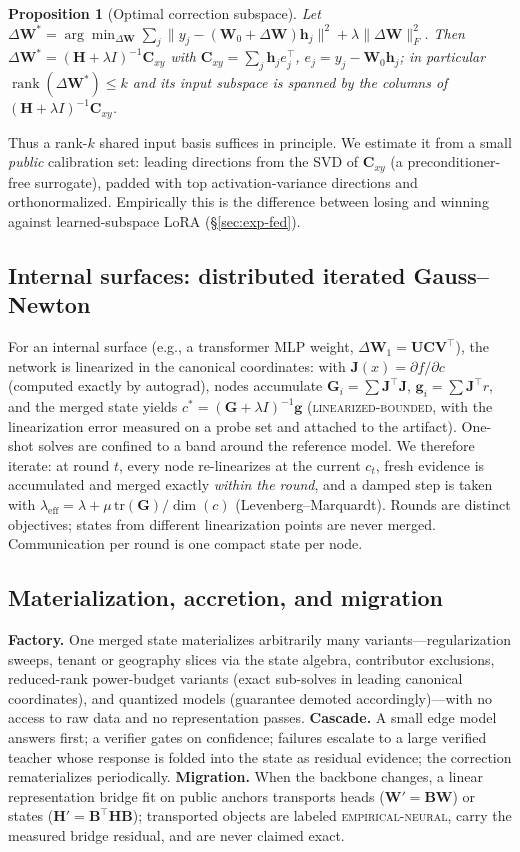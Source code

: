 \documentclass[11pt]{article}
\newtheorem{proposition}{Proposition}
\newcommand{\bH}{\mathbf{H}}
\newcommand{\bG}{\mathbf{G}}
\newcommand{\bg}{\mathbf{g}}
\newcommand{\bh}{\mathbf{h}}
\newcommand{\bW}{\mathbf{W}}
\newcommand{\bC}{\mathbf{C}}
\newcommand{\bJ}{\mathbf{J}}
\begin{document}
\begin{proposition}[Optimal correction subspace]\label{prop:subspace}
Let $\Delta\bW^\ast=\arg\min_{\Delta\bW}\sum_j\|y_j-(\bW_0+\Delta\bW)
\bh_j\|^2+\lambda\|\Delta\bW\|_F^2$. Then
$\Delta\bW^\ast=(\bH+\lambda I)^{-1}\bC_{xy}$ with
$\bC_{xy}=\sum_j\bh_j e_j^\top$, $e_j=y_j-\bW_0\bh_j$; in particular
$\operatorname{rank}(\Delta\bW^\ast)\le k$ and its input subspace is
spanned by the columns of $(\bH+\lambda I)^{-1}\bC_{xy}$.
\end{proposition}

Thus a rank-$k$ shared input basis suffices in principle. We estimate it
from a small \emph{public} calibration set: leading directions from the
SVD of $\bC_{xy}$ (a preconditioner-free surrogate), padded with top
activation-variance directions and orthonormalized. Empirically this is
the difference between losing and winning against learned-subspace LoRA
(\S\ref{sec:exp-fed}).

\subsection{Internal surfaces: distributed iterated Gauss--Newton}
For an internal surface (e.g., a transformer MLP weight,
$\Delta\bW_1=\mathbf{U}\bC\mathbf{V}^\top$), the network is linearized in
the canonical coordinates: with
$\bJ(x)=\partial f/\partial c$ (computed exactly by autograd), nodes
accumulate $\bG_i=\sum\bJ^\top\bJ$, $\bg_i=\sum\bJ^\top r$, and the
merged state yields $c^\ast=(\bG+\lambda I)^{-1}\bg$
(\textsc{linearized-bounded}, with the linearization error measured on a
probe set and attached to the artifact). One-shot solves are confined to
a band around the reference model. We therefore iterate: at round $t$,
every node re-linearizes at the current $c_t$, fresh evidence is
accumulated and merged exactly \emph{within the round}, and a damped step
is taken with $\lambda_{\mathrm{eff}}=\lambda+\mu\,\mathrm{tr}(\bG)/
\dim(c)$ (Levenberg--Marquardt). Rounds are distinct objectives; states
from different linearization points are never merged. Communication per
round is one compact state per node.

\subsection{Materialization, accretion, and migration}
\textbf{Factory.} One merged state materializes arbitrarily many
variants---regularization sweeps, tenant or geography slices via the
state algebra, contributor exclusions, reduced-rank power-budget
variants (exact sub-solves in leading canonical coordinates), and
quantized models (guarantee demoted accordingly)---with no access to raw
data and no representation passes.
\textbf{Cascade.} A small edge model answers first; a verifier gates on
confidence; failures escalate to a large verified teacher whose response
is folded into the state as residual evidence; the correction
rematerializes periodically.
\textbf{Migration.} When the backbone changes, a linear representation
bridge fit on public anchors transports heads
($\bW'=\mathbf{B}\bW$) or states
($\bH'=\mathbf{B}^\top\bH\mathbf{B}$); transported objects are labeled
\textsc{empirical-neural}, carry the measured bridge residual, and are
never claimed exact.
\end{document}
